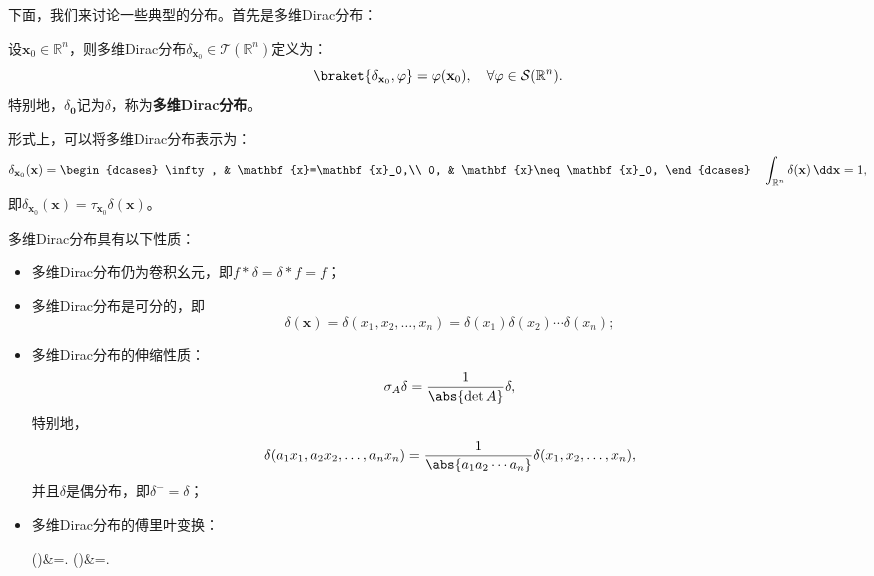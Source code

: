 下面，我们来讨论一些典型的分布。首先是多维Dirac分布：
\begin{definition}[多维Dirac分布]
    设$\mathbf{x}_0\in\mathbb{R}^n$，则多维Dirac分布$\delta_{\mathbf{x}_0}\in\mathcal{T}(\mathbb{R}^n)$定义为：
    \begin{equation}
        \braket{\delta_{\mathbf{x}_0},\varphi}=\varphi(\mathbf{x}_0),\quad \forall\varphi\in\mathcal{S}(\mathbb{R}^n).
    \end{equation}
    特别地，$\delta_{\mathbf{0}}$记为$\delta$，称为\textbf{多维Dirac分布}。

    形式上，可以将多维Dirac分布表示为：
    \begin{equation}
        \delta_{\mathbf{x}_0}(\mathbf{x})=\begin{dcases}
            \infty, & \mathbf{x}=\mathbf{x}_0,\\
            0, & \mathbf{x}\neq\mathbf{x}_0,
        \end{dcases}\quad \int_{\mathbb{R}^n}\delta(\mathbf{x})\,\dd\mathbf{x}=1,
    \end{equation}
    即$\delta_{\mathbf{x}_0}(\mathbf{x})=\tau_{\mathbf{x}_0}\delta(\mathbf{x})$。
\end{definition}
\begin{proposition}[多维Dirac分布的性质]
    多维Dirac分布具有以下性质：
    \begin{itemize}
        \item 多维Dirac分布仍为卷积幺元，即$f*\delta=\delta*f=f$；
        \item 多维Dirac分布是可分的，即
        \begin{equation}
            \delta(\mathbf{x})=\delta(x_1,x_2,\ldots,x_n)=\delta(x_1)\delta(x_2)\cdots\delta(x_n);
        \end{equation}
        \item 多维Dirac分布的伸缩性质：
        \begin{equation}
            \sigma_A\delta=\frac{1}{\abs{\det A}}\delta,
        \end{equation}
        特别地，
        \begin{equation}
            \delta(a_1 x_1,a_2 x_2,\ldots,a_n x_n)=\frac{1}{\abs{a_1 a_2\cdots a_n}}\delta(x_1,x_2,\ldots,x_n),
        \end{equation}
        并且$\delta$是偶分布，即$\delta^-=\delta$；
        \item 多维Dirac分布的傅里叶变换：
        \begin{lralign}
            \delta(\boldsymbol{\xi})&=.
            \switch
            \delta(\boldsymbol{\omega})&=.
        \end{lralign}
    \end{itemize}
\end{proposition}

